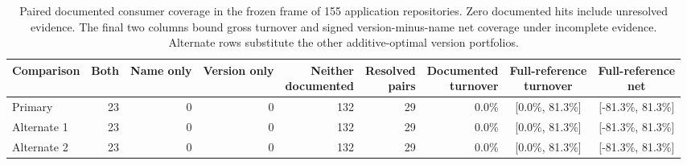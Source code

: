 \begin{table}[t]
\centering\small
\caption{Paired documented consumer coverage in the frozen frame of 155 application repositories. Zero documented hits include unresolved evidence. The final two columns bound gross turnover and signed version-minus-name net coverage under incomplete evidence. Alternate rows substitute the other additive-optimal version portfolios.}
\label{tab:consumer_holdout}
\setlength{\tabcolsep}{5pt}
\begin{tabular}{lrrrrrrcc}
\toprule
Comparison & Both & Name only & Version only & \shortstack{Neither\\documented} & \shortstack{Resolved\\pairs} & \shortstack{Documented\\turnover} & \shortstack{Full-reference\\turnover} & \shortstack{Full-reference\\net}\\
\midrule
Primary & 23 & 0 & 0 & 132 & 29 & 0.0\% & [0.0\%, 81.3\%] & [-81.3\%, 81.3\%]\\
Alternate 1 & 23 & 0 & 0 & 132 & 29 & 0.0\% & [0.0\%, 81.3\%] & [-81.3\%, 81.3\%]\\
Alternate 2 & 23 & 0 & 0 & 132 & 29 & 0.0\% & [0.0\%, 81.3\%] & [-81.3\%, 81.3\%]\\
\bottomrule
\end{tabular}
\end{table}
